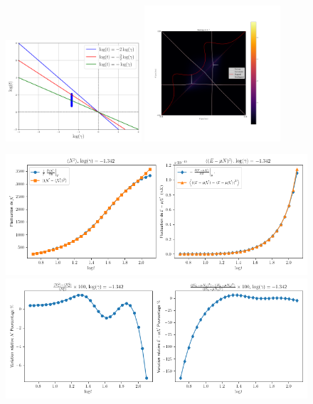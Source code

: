 \begin{figure}[H]
	\centering 
	\includegraphics[width=0.45\textwidth]{Figures/diagram.png}	
	\includegraphics[width=0.45\textwidth]{Figures/fluctu.png}	
\end{figure}


\begin{figure}[H]
	\centering 
	\includegraphics[width=1\textwidth]{Figures/fluctuations_plot_log_gamma=-1.342.png}	
	\includegraphics[width=1\textwidth]{Figures/fluctuations_relativ_plot_log_gamma=-1.342.png}	
	\captionsetup{skip=10pt} %
	\label{fig.fluctu.A}
\end{figure}



